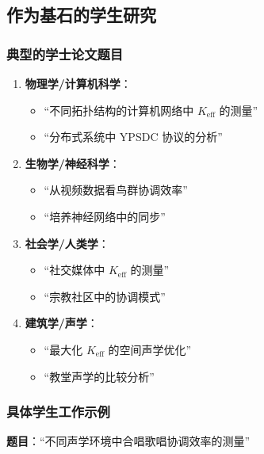 \documentclass[12pt,a4paper]{article}
\begin{document}
	\subsection{作为基石的学生研究}
	
	\subsubsection{典型的学士论文题目}
	
	\begin{enumerate}
		\item \textbf{物理学/计算机科学}：
		\begin{itemize}
			\item “不同拓扑结构的计算机网络中 $K_{\mathrm{eff}}$ 的测量”
			\item “分布式系统中 YPSDC 协议的分析”
		\end{itemize}
		
		\item \textbf{生物学/神经科学}：
		\begin{itemize}
			\item “从视频数据看鸟群协调效率”
			\item “培养神经网络中的同步”
		\end{itemize}
		
		\item \textbf{社会学/人类学}：
		\begin{itemize}
			\item “社交媒体中 $K_{\mathrm{eff}}$ 的测量”
			\item “宗教社区中的协调模式”
		\end{itemize}
		
		\item \textbf{建筑学/声学}：
		\begin{itemize}
			\item “最大化 $K_{\mathrm{eff}}$ 的空间声学优化”
			\item “教堂声学的比较分析”
		\end{itemize}
	\end{enumerate}
	
	\subsubsection{具体学生工作示例}
	
	\textbf{题目}：“不同声学环境中合唱歌唱协调效率的测量”
	
\end{document}
